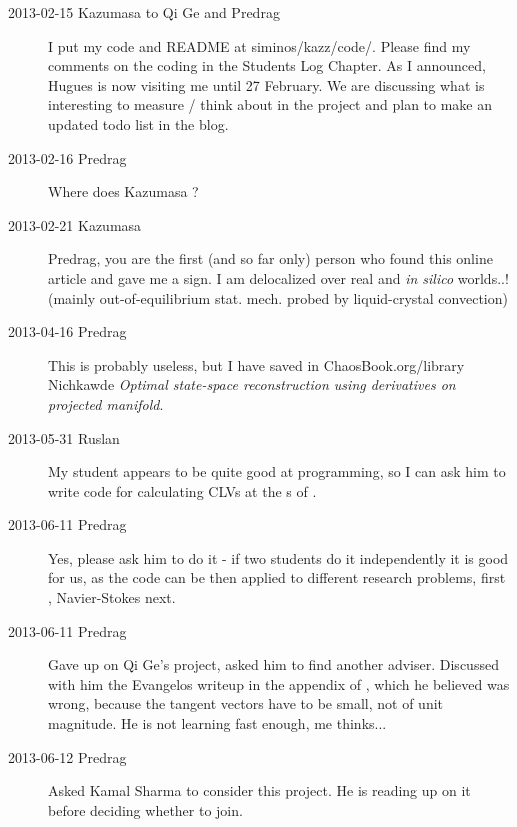 \begin{description}
\item[2013-02-15 Kazumasa to Qi Ge and Predrag]
I put my code and README at siminos/kazz/code/.
Please find my comments on the coding in the Students Log Chapter.
As I announced, Hugues is now visiting me until 27 February.
We are discussing what is interesting to measure / think about in the project
 and plan to make an updated todo list in the blog.

\item[2013-02-16 Predrag]
Where does Kazumasa
?

\item[2013-02-21 Kazumasa]
Predrag, you are the first (and so far only) person who found this
online article and gave me a sign. I am delocalized over real and
\textit{in silico} worlds..! (mainly out-of-equilibrium stat. mech.
probed by liquid-crystal convection)

\item[2013-04-16 Predrag]
This is probably useless, but I have saved in ChaosBook.org/library
Nichkawde {\em Optimal state-space reconstruction
using derivatives on projected manifold}.

\item[2013-05-31 Ruslan]
My student appears to be quite good at programming, so I can ask him to
write code for calculating CLVs at the \rpo s of \KS.

\item[2013-06-11 Predrag]
Yes, please ask him to do it - if two students do it independently it
is good for us, as the code can be then applied to different research problems,
first \KS, Navier-Stokes next.


\item[2013-06-11 Predrag]
Gave up on Qi Ge's project, asked him to find another adviser.
Discussed with him the Evangelos writeup in the appendix of
, which he believed was wrong, because the tangent
vectors have to be small, not of unit magnitude. He is not learning
fast enough, me thinks...

\item[2013-06-12 Predrag] Asked Kamal Sharma to consider this project.
He is reading up on it before deciding whether to join.


\end{description}

\renewcommand{\ssp}{a}
